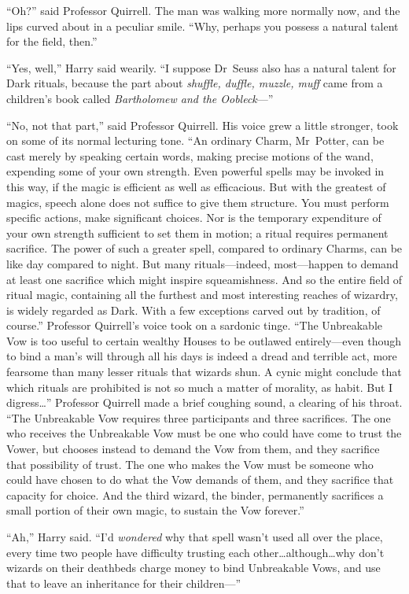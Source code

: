 “Oh?” said Professor Quirrell. The man was walking more normally now, and the lips curved about in a peculiar smile. “Why, perhaps you possess a natural talent for the field, then.”

“Yes, well,” Harry said wearily. “I suppose Dr~Seuss also has a natural talent for Dark rituals, because the part about \emph{shuffle, duffle, muzzle, muff} came from a children’s book called \emph{Bartholomew and the Oobleck}—”

“No, not that part,” said Professor Quirrell. His voice grew a little stronger, took on some of its normal lecturing tone. “An ordinary Charm, Mr~Potter, can be cast merely by speaking certain words, making precise motions of the wand, expending some of your own strength. Even powerful spells may be invoked in this way, if the magic is efficient as well as efficacious. But with the greatest of magics, speech alone does not suffice to give them structure. You must perform specific actions, make significant choices. Nor is the temporary expenditure of your own strength sufficient to set them in motion; a ritual requires permanent sacrifice. The power of such a greater spell, compared to ordinary Charms, can be like day compared to night. But many rituals—indeed, most—happen to demand at least one sacrifice which might inspire squeamishness. And so the entire field of ritual magic, containing all the furthest and most interesting reaches of wizardry, is widely regarded as Dark. With a few exceptions carved out by tradition, of course.” Professor Quirrell’s voice took on a sardonic tinge. “The Unbreakable Vow is too useful to certain wealthy Houses to be outlawed entirely—even though to bind a man’s will through all his days is indeed a dread and terrible act, more fearsome than many lesser rituals that wizards shun. A cynic might conclude that which rituals are prohibited is not so much a matter of morality, as habit. But I digress…” Professor Quirrell made a brief coughing sound, a clearing of his throat. “The Unbreakable Vow requires three participants and three sacrifices. The one who receives the Unbreakable Vow must be one who could have come to trust the Vower, but chooses instead to demand the Vow from them, and they sacrifice that possibility of trust. The one who makes the Vow must be someone who could have chosen to do what the Vow demands of them, and they sacrifice that capacity for choice. And the third wizard, the binder, permanently sacrifices a small portion of their own magic, to sustain the Vow forever.”

“Ah,” Harry said. “I’d \emph{wondered} why that spell wasn’t used all over the place, every time two people have difficulty trusting each other…although…why don’t wizards on their deathbeds charge money to bind Unbreakable Vows, and use that to leave an inheritance for their children—”

